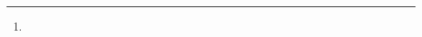 \documentclass{article}
\title{\PaperTitle}
\date{}   %
\author[1]{%
  \href{\AuthorOneOrcid}{\usebox{\orcid}~\AuthorOneName\thanks{\texttt{\AuthorOneEmail}}}%
}
\affil[1]{\AuthorOneAffil}
\begin{document}
\maketitle

\begin{abstract}
  
\end{abstract}

\keywords{\PaperKeywords}





\end{document}
